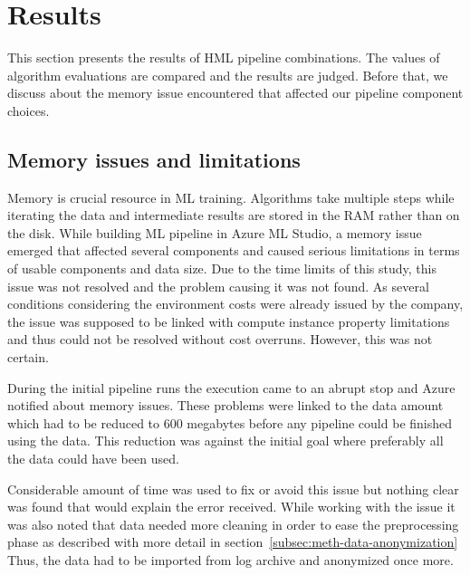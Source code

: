 

\section{Results}\label{sec:results}

This section presents the results of HML pipeline combinations.
The values of algorithm evaluations are compared
and the results are judged.
Before that,
we discuss about the memory issue encountered
that affected our pipeline component choices.




\subsection{Memory issues and limitations}\label{subsec:res-memory-issues}
Memory is crucial resource in ML training.
Algorithms take multiple steps while iterating the data
and intermediate results are stored in the RAM rather than on the disk.
While building ML pipeline in Azure ML Studio,
a memory issue emerged
that affected several components
and caused serious limitations
in terms of usable components and data size.
Due to the time limits of this study,
this issue was not resolved
and the problem causing it was not found.
As several conditions
considering the environment costs
were already issued by the company,
the issue was supposed to be linked with
compute instance property limitations
and thus could not be resolved without cost overruns.
However, this was not certain.








During the initial pipeline runs
the execution came to an abrupt stop
and Azure notified about memory issues. %
These problems were linked to the data amount
which had to be reduced to 600 megabytes
before any pipeline could be finished using the data.
This reduction was against the initial goal
where preferably all the data could have been used.

Considerable amount of time was used
to fix or avoid this issue
but nothing clear was found
that would explain the error received.
While working with the issue
it was also noted
that data needed more cleaning
in order to ease the preprocessing phase
as described with more detail in section~\ref{subsec:meth-data-anonymization}
Thus,
the data had to be imported from log archive
and anonymized once more.

